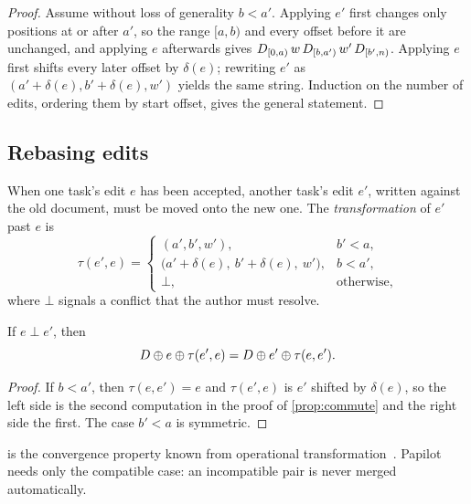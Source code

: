 \begin{proof}
Assume without loss of generality $b < a'$. Applying $e'$ first changes only
positions at or after $a'$, so the range $[a, b)$ and every offset before it are
unchanged, and applying $e$ afterwards gives
$D_{[0,a)}\, w\, D_{[b,a')}\, w'\, D_{[b',n)}$. Applying $e$ first
shifts every later offset by $\delta(e)$; rewriting $e'$ as
$(a'+\delta(e), b'+\delta(e), w')$ yields the same string. Induction on the
number of edits, ordering them by start offset, gives the general statement.
\end{proof}

\subsection{Rebasing edits}

When one task's edit $e$ has been accepted, another task's edit $e'$, written
against the old document, must be moved onto the new one. The
\emph{transformation} of $e'$ past $e$ is
\begin{equation}
  \tau(e', e) =
  \begin{cases}
    (a', b', w'), & b' < a,\\
    \bigl(a' + \delta(e),\ b' + \delta(e),\ w'\bigr), & b < a',\\
    \bot, & \text{otherwise,}
  \end{cases}
  \label{eq:transform}
\end{equation}
where $\bot$ signals a conflict that the author must resolve.

\begin{lemma}
\label{lem:tp1}
If $e \perp e'$, then
\begin{equation}
  D \oplus e \oplus \tau(e', e) = D \oplus e' \oplus \tau(e, e') .
  \label{eq:tp1}
\end{equation}
\end{lemma}

\begin{proof}
If $b < a'$, then $\tau(e, e') = e$ and $\tau(e', e)$ is $e'$ shifted by
$\delta(e)$, so the left side is the second computation in the proof of
\cref{prop:commute} and the right side the first. The case $b' < a$ is
symmetric.
\end{proof}

 is the convergence property known from operational
transformation~\cite{ellis1989}. Papilot needs only the compatible case: an
incompatible pair is never merged automatically.

